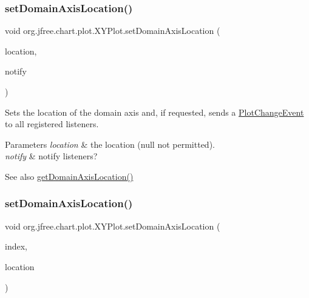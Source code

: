 \subsubsection{\texorpdfstring{set\+Domain\+Axis\+Location()}{setDomainAxisLocation()}\hspace{0.1cm}{\footnotesize\ttfamily [2/4]}}
{\footnotesize\ttfamily void org.\+jfree.\+chart.\+plot.\+X\+Y\+Plot.\+set\+Domain\+Axis\+Location (\begin{DoxyParamCaption}\item[{\mbox{\hyperlink{classorg_1_1jfree_1_1chart_1_1axis_1_1_axis_location}{Axis\+Location}}}]{location,  }\item[{boolean}]{notify }\end{DoxyParamCaption})}

Sets the location of the domain axis and, if requested, sends a \mbox{\hyperlink{}{Plot\+Change\+Event}} to all registered listeners.


\begin{DoxyParams}{Parameters}
{\em location} & the location ({\ttfamily null} not permitted). \\
\hline
{\em notify} & notify listeners?\\
\hline
\end{DoxyParams}
\begin{DoxySeeAlso}{See also}
\mbox{\hyperlink{classorg_1_1jfree_1_1chart_1_1plot_1_1_x_y_plot_a10a59b35a61cf4cd839e23f498ab674e}{get\+Domain\+Axis\+Location()}} 
\end{DoxySeeAlso}
\mbox{\label{classorg_1_1jfree_1_1chart_1_1plot_1_1_x_y_plot_a67b3006bc00270da79f919e2970523c0}} 
\subsubsection{\texorpdfstring{set\+Domain\+Axis\+Location()}{setDomainAxisLocation()}\hspace{0.1cm}{\footnotesize\ttfamily [3/4]}}
{\footnotesize\ttfamily void org.\+jfree.\+chart.\+plot.\+X\+Y\+Plot.\+set\+Domain\+Axis\+Location (\begin{DoxyParamCaption}\item[{int}]{index,  }\item[{\mbox{\hyperlink{classorg_1_1jfree_1_1chart_1_1axis_1_1_axis_location}{Axis\+Location}}}]{location }\end{DoxyParamCaption})}

